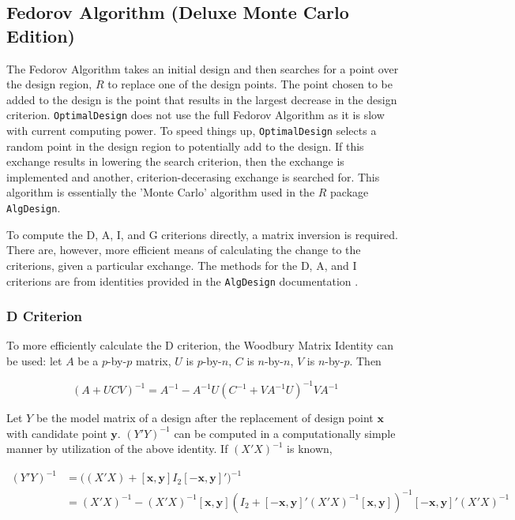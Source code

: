 \documentclass{article}\usepackage[]{graphicx}\usepackage[]{color}
\begin{document}
\subsection{Fedorov Algorithm (Deluxe Monte Carlo Edition)}
The Fedorov Algorithm takes an initial design and then searches for a point over the design region, $R$ to replace one of the design points. The point chosen to be added to the design is the point that results in the largest decrease in the design criterion. \texttt{OptimalDesign} does not use the full Fedorov Algorithm as it is slow with current computing power. To speed things up, \texttt{OptimalDesign} selects a random point in the design region to potentially add to the design. If this exchange results in lowering the search criterion, then the exchange is implemented and another, criterion-decerasing exchange is searched for. This algorithm is essentially the 'Monte Carlo' algorithm used in the $R$ package \texttt{AlgDesign}.

To compute the D, A, I, and G criterions directly, a matrix inversion is required. There are, however, more efficient means of calculating the change to the criterions, given a particular exchange. The methods for the D, A, and I criterions are from identities provided in the \texttt{AlgDesign} documentation \cite{algdesign}.

\subsubsection{D Criterion}
To more efficiently calculate the D criterion, the Woodbury Matrix Identity can be used: let $A$ be a $p$-by-$p$ matrix, $U$ is $p$-by-$n$, $C$ is $n$-by-$n$, $V$ is $n$-by-$p$. Then

$$ (A + UCV)^{-1} = A^{-1} - A^{-1}U(C^{-1} + VA^{-1}U)^{-1}VA^{-1} $$

Let $Y$ be the model matrix of a design after the replacement of design point $\textbf{x}$ with candidate point $\textbf{y}$. $(Y'Y)^{-1}$ can be computed in a computationally simple manner by utilization of the above identity. If $(X'X)^{-1}$ is known,

\begin{align*}
  (Y'Y)^{-1} &= \big( (X'X) + [\textbf{x},\textbf{y}] I_2 [-\textbf{x},\textbf{y}]' \big)^{-1} \\
  &= (X'X)^{-1} - (X'X)^{-1}[\textbf{x}, \textbf{y}] (I_2 + [-\textbf{x},\textbf{y}]' (X'X)^{-1} [\textbf{x},\textbf{y}] )^{-1} [-\textbf{x},\textbf{y}]' (X'X)^{-1} 
\end{align*}
\end{document}

